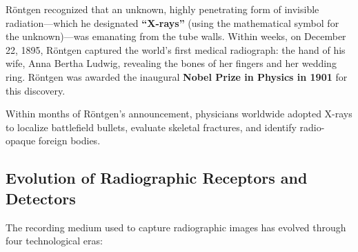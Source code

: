 \documentclass[11pt,a4paper]{article}
\begin{document}
Röntgen recognized that an unknown, highly penetrating form of invisible radiation—which he designated \textbf{``X-rays''} (using the mathematical symbol for the unknown)—was emanating from the tube walls. Within weeks, on December 22, 1895, Röntgen captured the world's first medical radiograph: the hand of his wife, Anna Bertha Ludwig, revealing the bones of her fingers and her wedding ring. Röntgen was awarded the inaugural \textbf{Nobel Prize in Physics in 1901} for this discovery.

Within months of Röntgen's announcement, physicians worldwide adopted X-rays to localize battlefield bullets, evaluate skeletal fractures, and identify radio-opaque foreign bodies.

\subsection{Evolution of Radiographic Receptors and Detectors}
The recording medium used to capture radiographic images has evolved through four technological eras:
\end{document}
